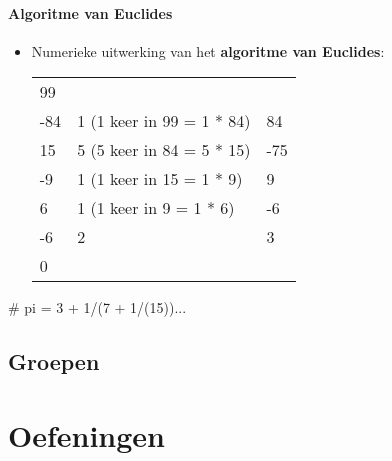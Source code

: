 \documentclass[12pt]{report}
\newcommand{\important}[1] {\textbf{\color{orange}#1}}
\begin{document}
\subsection{Algoritme van Euclides}
\begin{itemize}
	\item Numerieke uitwerking van het \important{algoritme van Euclides}: \newline
	      	      
	      \begin{tabular}{l l l}
	      	99  &                            &     \\
	      	-84 & 1 (1 keer in 99 = 1 * 84)  & 84  \\
	      	15  & 5  (5 keer in 84 = 5 * 15) & -75 \\
	      	-9  & 1  (1 keer in 15 = 1 * 9)  & 9   \\
	      	6   & 1   (1 keer in 9 = 1 * 6)  & -6  \\
	      	-6  & 2                          & 3   \\
	      	0   &                            &     
	      \end{tabular}
	      	      
	      	      
\end{itemize}


# pi = 3 + 1/(7 + 1/(15))...

\chapter{Groepen}
\label{ch:groepen}


\part{Oefeningen}
\end{document}
